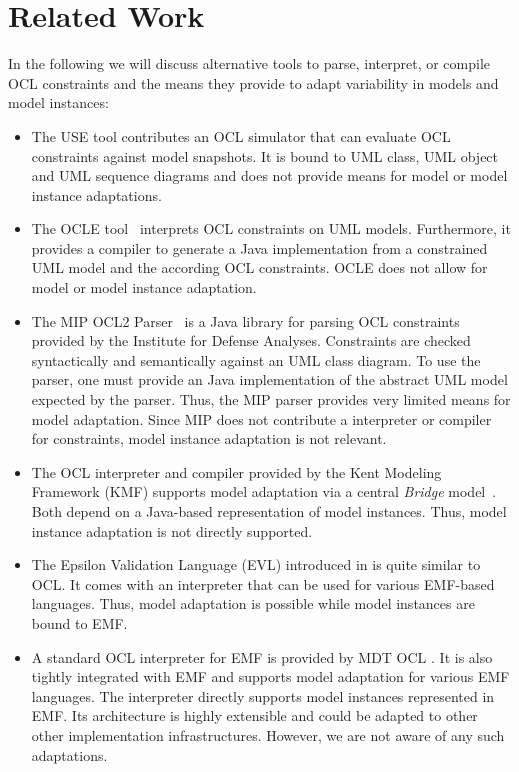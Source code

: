 \section{Related Work}
In the following we will discuss alternative tools to parse,
interpret, or compile OCL constraints and the means they provide
to adapt variability in models and model instances:

\begin{itemize}
  
\item The USE tool \cite{gogolla2007use} contributes an OCL simulator that can
evaluate OCL constraints against model snapshots. It is bound to UML class, UML object and
UML sequence diagrams and does not provide means for model or model instance
adaptations.

\item The OCLE tool~\cite{WWW:OCLE} interprets OCL constraints on
UML models. Furthermore, it provides a compiler to generate a Java
implementation from a constrained UML model and the according OCL 
constraints. OCLE does not allow for model or model instance adaptation.

\item The MIP OCL2 Parser~\cite{WWW:MIP} is a Java library for parsing OCL
constraints provided by the Institute for Defense Analyses. Constraints are
checked syntactically and semantically against an UML class diagram.
To use the parser, one must provide an Java implementation of the abstract 
UML model expected by the parser. Thus,
the MIP parser provides very limited means for model adaptation. Since MIP does
not contribute a interpreter or compiler for constraints, model
instance adaptation is not relevant.

\item The OCL interpreter and compiler provided by the Kent Modeling Framework
(KMF) supports model adaptation via a central \emph{Bridge}
model~\cite{akehurst2003ocl}. Both depend on a Java-based
representation of model instances. Thus, model instance adaptation is not
directly supported.

\item The Epsilon Validation Language (EVL) introduced in
\cite{kolovos2008detecting} is quite similar to OCL. It comes with an
interpreter that can be used for various EMF-based languages. Thus, model
adaptation is possible while model instances are bound to EMF.
 
\item A standard OCL interpreter for EMF is provided by MDT OCL
\cite{WWW:MDT}. It is also tightly integrated with EMF and supports 
model adaptation for various EMF languages. The interpreter directly supports
model instances represented in EMF. Its architecture is highly extensible
 and could be adapted to other other implementation
infrastructures. However, we are not aware of any such adaptations.

\end{itemize}





